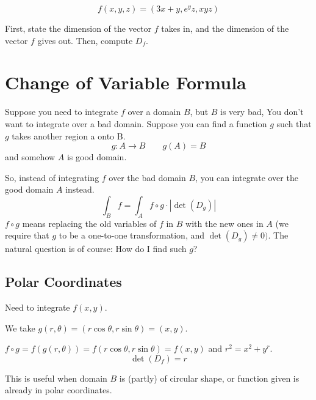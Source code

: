 \begin{exercise}
    $$f(x, y, z) = (3x + y, e^yz, xyz)$$

    First, state the dimension of the vector $f$ takes in, and the dimension of the vector $f$ gives out. Then, compute $D_f$.
\end{exercise}

\section{Change of Variable Formula}

Suppose you need to integrate $f$ over a domain $B$, but $B$ is very bad, You don't want to integrate over a bad domain. Suppose you can find a function $g$ such that $g$ takes another region a onto B. $$g: A \to B \qquad g(A) = B$$ and somehow $A$ is good domain. 

So, instead of integrating $f$ over the bad domain $B$, you can integrate over the good domain $A$ instead. $$\int_B f = \int_A f \circ g \cdot \left| \det(D_g) \right|$$ $f \circ g$ means replacing the old variables of $f$ in $B$ with the new ones in $A$ (we require that $g$ to be a one-to-one transformation, and $\det(D_g) \neq 0)$. The natural question is of course: How do I find such $g$?

\subsection{Polar Coordinates}

Need to integrate $f(x, y)$. 

We take $g(r,\theta) = (r\cos{\theta},r\sin{\theta}) = (x,y)$. 

$f \circ g = f(g(r, \theta)) = f(r\cos{\theta}, r\sin{\theta}) = f(x, y)$ and $r^2 = x^2 + y^r$. 
$$\det(D_f) = r$$

This is useful when domain $B$ is (partly) of circular shape, or function given is already in polar coordinates.

